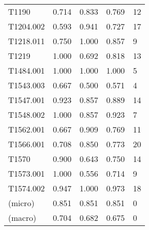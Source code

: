 \begin{tabular}{lrrrl}
    T1190      & 0.714 & 0.833 & 0.769 & 12  \\
    T1204.002  & 0.593 & 0.941 & 0.727 & 17  \\
    T1218.011  & 0.750 & 1.000 & 0.857 & 9   \\
    T1219      & 1.000 & 0.692 & 0.818 & 13  \\
    T1484.001  & 1.000 & 1.000 & 1.000 & 5   \\
    T1543.003  & 0.667 & 0.500 & 0.571 & 4   \\
    T1547.001  & 0.923 & 0.857 & 0.889 & 14  \\
    T1548.002  & 1.000 & 0.857 & 0.923 & 7   \\
    T1562.001  & 0.667 & 0.909 & 0.769 & 11  \\
    T1566.001  & 0.708 & 0.850 & 0.773 & 20  \\
    T1570      & 0.900 & 0.643 & 0.750 & 14  \\
    T1573.001  & 1.000 & 0.556 & 0.714 & 9   \\
    T1574.002  & 0.947 & 1.000 & 0.973 & 18  \\
    \midrule
    (micro)    & 0.851 & 0.851 & 0.851 & 0   \\
    (macro)    & 0.704 & 0.682 & 0.675 & 0   \\
    \bottomrule
\end{tabular}
